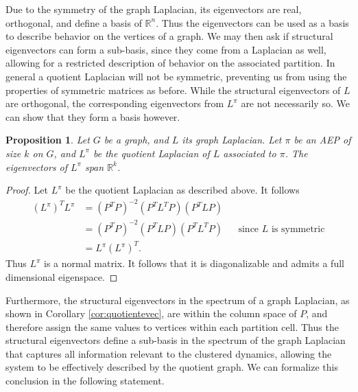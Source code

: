 \documentclass[%
 aip,
 amsmath,amssymb,
preprint,
reprint, onecolumn %
]{revtex4-1}
\newcommand{\R}{\mathbb{R}}
\newtheorem{prop}[theorem]{Proposition}
\begin{document}
Due to the symmetry of the graph Laplacian, its eigenvectors are real, orthogonal, and define a basis of $\R^n$. Thus the eigenvectors can be used as a basis to describe behavior on the vertices of a graph. We may then ask if structural eigenvectors can form a sub-basis, since they come from a Laplacian as well, allowing for a restricted description of behavior on the associated partition. In general a quotient Laplacian will not be symmetric, preventing us from using the properties of symmetric matrices as before. While the structural eigenvectors of $L$ are orthogonal, the corresponding eigenvectors from $L^\pi$ are not necessarily so. We can show that they form a basis however.
\begin{prop}\label{prop:quotientspan}
    Let $G$ be a graph, and $L$ its graph Laplacian. Let $\pi$ be an AEP of size $k$ on $G$, and $L^\pi$ be the quotient Laplacian of $L$ associated to $\pi$. The eigenvectors of $L^\pi$ span $\R^k$.
\end{prop}
\begin{proof}
    Let $L^\pi$ be the quotient Laplacian as described above. It follows
    \begin{align*}
        (L^\pi)^T L^\pi &= (P^TP)^{-2}\left(P^T L^T P\right)\left(P^T L P\right)\\
        &= (P^TP)^{-2}\left(P^T L P\right)\left(P^T L^T P\right)    &&\text{since $L$ is symmetric}\\
        &=L^\pi(L^\pi)^T .
    \end{align*}
    Thus $L^\pi$ is a normal matrix. It follows that it is diagonalizable and admits a full dimensional eigenspace.
\end{proof}

Furthermore, the structural eigenvectors in the spectrum of a graph Laplacian, as shown in Corollary \ref{cor:quotientevec}, are within the column space of $P$, and therefore assign the same values to vertices within each partition cell. Thus the structural eigenvectors define a sub-basis in the spectrum of the graph Laplacian that captures all information relevant to the clustered dynamics, allowing the system to be effectively described by the quotient graph. We can formalize this conclusion in the following statement.
\end{document}
